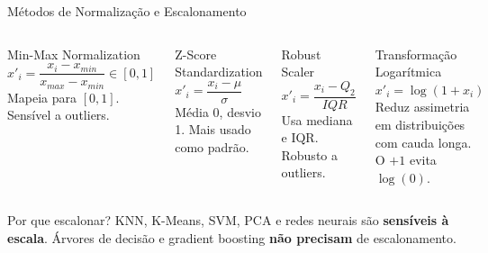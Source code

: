 \documentclass[aspectratio=169]{beamer}
\begin{document}
\begin{frame}{Métodos de Normalização e Escalonamento}
    \begin{columns}[T]
        \begin{exampleblock}{Min-Max Normalization}
            $x'_i = \dfrac{x_i - x_{min}}{x_{max} - x_{min}} \in [0,1]$\\[0.3em]
            \footnotesize Mapeia para $[0,1]$. Sensível a outliers.
        \end{exampleblock}
        \vspace{0.4em}
        \begin{exampleblock}{Z-Score Standardization}
            $x'_i = \dfrac{x_i - \mu}{\sigma}$\\[0.3em]
            \footnotesize Média 0, desvio 1. Mais usado como padrão.
        \end{exampleblock}

        \begin{exampleblock}{Robust Scaler}
            $x'_i = \dfrac{x_i - Q_2}{IQR}$\\[0.3em]
            \footnotesize Usa mediana e IQR. Robusto a outliers.
        \end{exampleblock}
        \vspace{0.4em}
        \begin{exampleblock}{Transformação Logarítmica}
            $x'_i = \log(1 + x_i)$\\[0.3em]
            \footnotesize Reduz assimetria em distribuições com cauda longa. O $+1$ evita $\log(0)$.
        \end{exampleblock}
    \end{columns}

    \vspace{0.4em}
    \begin{alertblock}{Por que escalonar?}
        \small KNN, K-Means, SVM, PCA e redes neurais são \textbf{sensíveis à escala}. Árvores de decisão e gradient boosting \textbf{não precisam} de escalonamento.
    \end{alertblock}
\end{frame}
\end{document}
